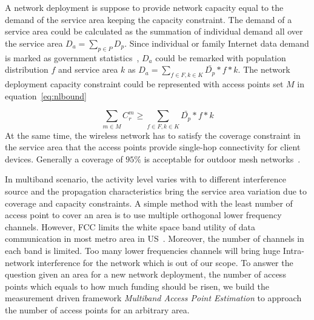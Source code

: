 A network deployment is suppose to provide network capacity equal to the demand of the service 
area keeping the capacity constraint. The demand of a service area could be calculated as the 
summation of individual demand all over the service area $D_a=\sum_{p\in P}D_p$. Since 
individual or family Internet data demand is marked as government statistics~\cite{rosston2011household}, 
$D_a$ could be remarked with population distribution $f$ and service area $k$ as 
$D_a=\sum_{f \in F,k \in K}\bar{D_p}*f*k$. 
The network deployment capacity constraint could be represented with access points set $M$ 
in equation~\ref{eq:nlbound}

\begin{equation}
\label{eq:nlbound}
\sum_{m \in M}C_r^m \ge \sum_{f \in F,k \in K}\bar{D_p}*f*k
\end{equation}
At the same time, the wireless network has to satisfy the coverage constraint in the service 
area that the access points provide single-hop connectivity for client devices. 
Generally a coverage of $95\%$ is acceptable for outdoor mesh networks~\cite{robinson2010deploying}.

In multiband scenario, the activity level varies with to different interference source 
and the propagation characteristics bring the service area variation due to coverage and 
capacity constraints. A simple method with the least number of access point to cover an area is to use 
multiple orthogonal lower frequency channels. However, FCC limits the white space band utility 
of data communication in most metro area in US~\cite{googledatabase}. Moreover, the number of channels in each 
band is limited. Too many lower frequencies channels will bring huge Intra-network interference for 
the network which is out of our scope. To answer the question given an area for a new network deployment, 
the number of access points which equals to how much funding should be risen, we build the measurement driven
framework {\it Multiband Access Point Estimation} to approach the number of access points for
an arbitrary area.

